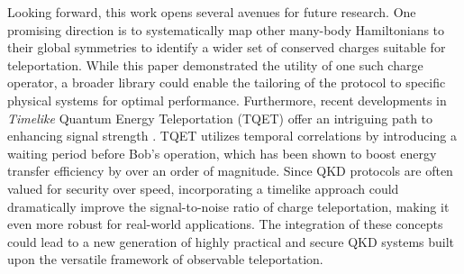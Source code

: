 Looking forward, this work opens several avenues for future research. One promising direction is to systematically map other many-body Hamiltonians to their global symmetries to identify a wider set of conserved charges suitable for teleportation. While this paper demonstrated the utility of one such charge operator, a broader library could enable the tailoring of the protocol to specific physical systems for optimal performance. Furthermore, recent developments in \textit{Timelike} Quantum Energy Teleportation (TQET) offer an intriguing path to enhancing signal strength \cite{Ikeda2025_TQET, Pirandola2020, Lo2012, Acin2007}. TQET utilizes temporal correlations by introducing a waiting period before Bob's operation, which has been shown to boost energy transfer efficiency by over an order of magnitude. Since QKD protocols are often valued for security over speed, incorporating a timelike approach could dramatically improve the signal-to-noise ratio of charge teleportation, making it even more robust for real-world applications. The integration of these concepts could lead to a new generation of highly practical and secure QKD systems built upon the versatile framework of observable teleportation.
